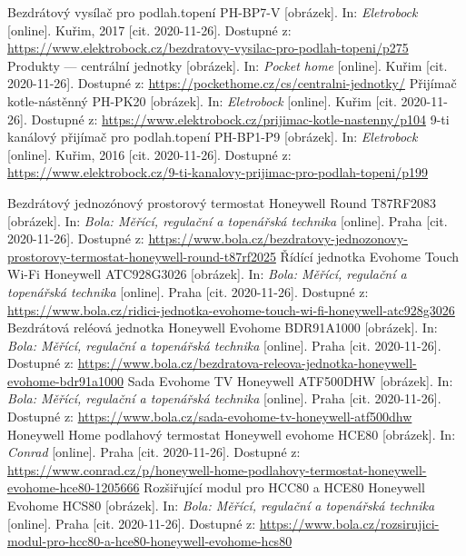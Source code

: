 \begin{thebibliography}{3}
Bezdrátový vysílač pro podlah.topení PH-BP7-V [obrázek]. In: \textit{Eletrobock} [online]. Kuřim, 2017 [cit. 2020-11-26]. Dostupné z: \url{https://www.elektrobock.cz/bezdratovy-vysilac-pro-podlah-topeni/p275}
Produkty --- centrální jednotky [obrázek]. In: \textit{Pocket home} [online]. Kuřim [cit. 2020-11-26]. Dostupné z: \url{https://pockethome.cz/cs/centralni-jednotky/}
Přijímač kotle-nástěnný PH-PK20 [obrázek]. In: \textit{Eletrobock} [online]. Kuřim [cit. 2020-11-26]. Dostupné z: \url{https://www.elektrobock.cz/prijimac-kotle-nastenny/p104}
9-ti kanálový přijímač pro podlah.topení PH-BP1-P9 [obrázek]. In: \textit{Eletrobock} [online]. Kuřim, 2016 [cit. 2020-11-26]. Dostupné z: \url{https://www.elektrobock.cz/9-ti-kanalovy-prijimac-pro-podlah-topeni/p199}

Bezdrátový jednozónový prostorový termostat Honeywell Round T87RF2083 [obrázek]. In: \textit{Bola: Měřící, regulační a topenářská technika} [online]. Praha [cit. 2020-11-26]. Dostupné z: \url{https://www.bola.cz/bezdratovy-jednozonovy-prostorovy-termostat-honeywell-round-t87rf2025}
Řídící jednotka Evohome Touch Wi-Fi Honeywell ATC928G3026 [obrázek]. In: \textit{Bola: Měřící, regulační a topenářská technika} [online]. Praha [cit. 2020-11-26]. Dostupné z: \url{https://www.bola.cz/ridici-jednotka-evohome-touch-wi-fi-honeywell-atc928g3026}
Bezdrátová reléová jednotka Honeywell Evohome BDR91A1000 [obrázek]. In: \textit{Bola: Měřící, regulační a topenářská technika} [online]. Praha [cit. 2020-11-26]. Dostupné z: \url{https://www.bola.cz/bezdratova-releova-jednotka-honeywell-evohome-bdr91a1000}
Sada Evohome TV Honeywell ATF500DHW [obrázek]. In: \textit{Bola: Měřící, regulační a topenářská technika} [online]. Praha [cit. 2020-11-26]. Dostupné z: \url{https://www.bola.cz/sada-evohome-tv-honeywell-atf500dhw}
Honeywell Home podlahový termostat Honeywell evohome HCE80 [obrázek]. In: \textit{Conrad} [online]. Praha [cit. 2020-11-26]. Dostupné z: \url{https://www.conrad.cz/p/honeywell-home-podlahovy-termostat-honeywell-evohome-hce80-1205666}
Rozšiřující modul pro HCC80 a HCE80 Honeywell Evohome HCS80 [obrázek]. In: \textit{Bola: Měřící, regulační a topenářská technika} [online]. Praha [cit. 2020-11-26]. Dostupné z: \url{https://www.bola.cz/rozsirujici-modul-pro-hcc80-a-hce80-honeywell-evohome-hcs80}


\end{thebibliography}
